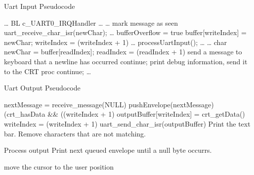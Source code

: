 \documentclass[12pt]{report}
\begin{document}
\begin{algorithm}
    \caption{Uart Input Pseudocode}
    \label{code:uart_input}
    \begin{algorithmic}[1]
            \State \ldots
            \State BL c\_UART0\_IRQHandler
            \State \ldots
        \EndFunction
            \State \ldots
            \State mark message as seen
            \State uart\_receive\_char\_isr(newChar);
            \State \ldots
        \EndFunction
                \State bufferOverflow = true
                \State \Return
            \EndIf
            \State buffer[writeIndex] = newChar;
            \State writeIndex = (writeIndex + 1) %
        \EndFunction
            \State \ldots
            \State processUartInput();
            \State \ldots
        \EndFunction
            \State \ldots
                \State char newChar = buffer[readIndex];
                \State readIndex = (readIndex + 1) %
                    \State send a message to keyboard that a newline has occurred
                    \State continue;
                    \State print debug information, send it to the CRT proc
                    \State continue;
                \EndIf
            \EndWhile
            \State \ldots
        \EndFunction
    \end{algorithmic}
\end{algorithm}

\begin{algorithm}
    \caption{Uart Output Pseudocode}
    \label{code:uart_output}
    \begin{algorithmic}[1]
            \Loop
                \State nextMessage = receive\_message(NULL)
                \State pushEnvelope(nextMessage)
                \While(crt\_hasData \&\& ((writeIndex + 1) %
                    \State outputBuffer[writeIndex] = crt\_getData()
                    \State writeIndex = (writeIndex + 1) %
                \EndWhile
                \State uart\_send\_char\_isr(outputBuffer)
            \EndLoop
        \EndFunction
            \State Print the text bar. Remove characters that are not matching.

            \State Process output
                \State Print next queued envelope until a null byte occurrs.
            \EndWhile

            \State move the cursor to the user position
        \EndFunction
    \end{algorithmic}
\end{algorithm}
\end{document}
